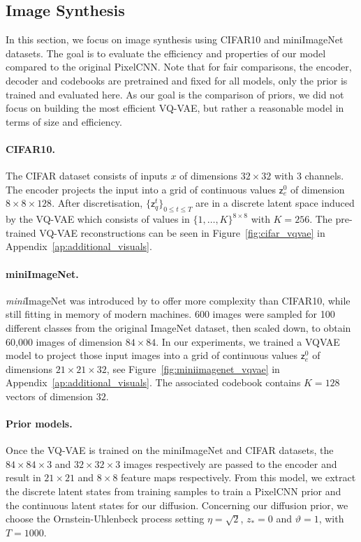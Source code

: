 \documentclass{article}
\theoremstyle{plain}
\theoremstyle{definition}
\theoremstyle{remark}
\newcommand{\latentcont}{\mathsf{z}_e}
\newcommand{\latentdis}{\mathsf{z}_q}
\begin{document}
\subsection{Image Synthesis}
In this section, we focus on image synthesis using CIFAR10 and miniImageNet datasets. The goal is to evaluate the efficiency and properties of our model compared to the original PixelCNN. Note that for fair comparisons, the encoder, decoder and codebooks are pretrained and fixed for all models, only the prior is trained and evaluated here. As our goal is the comparison of priors, we did not focus on building the most efficient VQ-VAE, but rather a reasonable model in terms of size and efficiency.

\paragraph{CIFAR10. }
The CIFAR dataset consists of inputs $x$ of dimensions $32 \times 32$ with 3 channels. The encoder projects the input into a grid of continuous values $\latentcont^0$ of dimension $8 \times 8 \times 128$. After discretisation, $\{\latentdis^t\}_{0\leqslant t\leqslant T}$ are in a discrete latent space induced by the VQ-VAE which consists of values in $\{1,\ldots,K\}^{8 \times 8}$ with $K=256$. The pre-trained VQ-VAE reconstructions can be seen in Figure~\ref{fig:cifar_vqvae} in Appendix~\ref{ap:additional_visuals}.

\paragraph{miniImageNet. }
\textit{mini}ImageNet was introduced by \cite{Vinyals2016MatchingNF} to offer more complexity than CIFAR10, while still fitting in memory of modern machines.
600 images were sampled for 100 different classes from the original ImageNet dataset, then scaled down, to obtain 60,000 images of dimension $84 \times 84$.
In our experiments, we trained a VQVAE model to project those input images into a grid of continuous values $\latentcont^0$ of dimensions $21 \times 21 \times 32$, see Figure~\ref{fig:miniimagenet_vqvae} in Appendix~\ref{ap:additional_visuals}.
The associated codebook contains $K=128$ vectors of dimension $32$.

\paragraph{Prior models. }
Once the VQ-VAE is trained on the miniImageNet and CIFAR datasets, the $84\times 84 \times 3$ and $32\times 32 \times 3$ images respectively are passed to the encoder and result in $21 \times 21$ and $8 \times 8$ feature maps respectively. From this model, we extract the discrete latent states from training samples to train a PixelCNN prior and the continuous latent states for our diffusion.
Concerning our diffusion prior, we choose the Ornstein-Uhlenbeck process setting $\eta = \sqrt{2}$, $z_*=0$ and $\vartheta = 1$, with $T=1000$.
\end{document}
